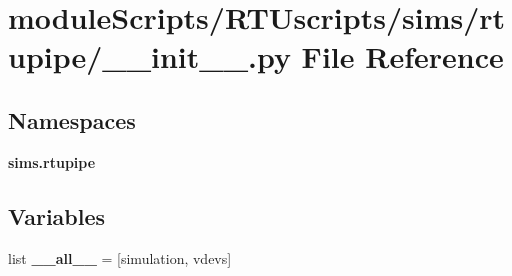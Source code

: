 \section{module\+Scripts/\+R\+T\+Uscripts/sims/rtupipe/\+\_\+\+\_\+init\+\_\+\+\_\+.py File Reference}
\label{sims_2rtupipe_2____init_____8py}
\subsection*{Namespaces}
\begin{DoxyCompactItemize}
\item 
 {\bf sims.\+rtupipe}
\end{DoxyCompactItemize}
\subsection*{Variables}
\begin{DoxyCompactItemize}
\item 
list {\bf \+\_\+\+\_\+all\+\_\+\+\_\+} = [\textquotesingle{}simulation\textquotesingle{}, \textquotesingle{}vdevs\textquotesingle{}]
\end{DoxyCompactItemize}
